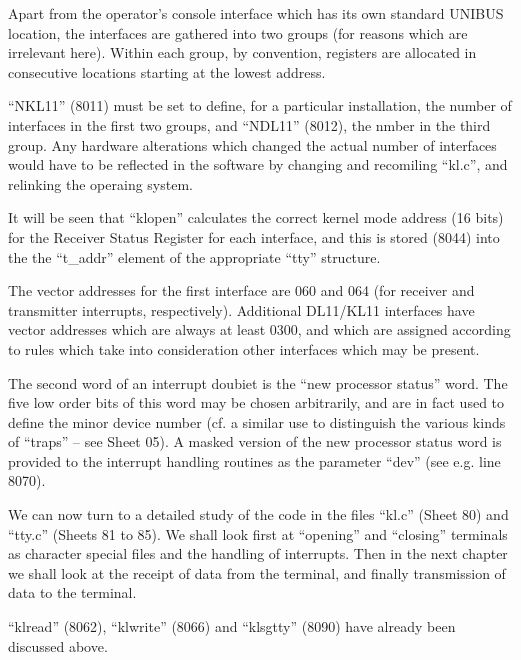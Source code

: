 Apart from the operator's console
interface which has its own standard
UNIBUS location, the interfaces are
gathered into two groups (for reasons
which are irrelevant here). Within
each group, by convention, registers
are allocated in consecutive locations
starting at the lowest address.


``NKL11'' (8011) must be set to define,
for a particular installation, the
number of interfaces in the first two
groups, and ``NDL11'' (8012), the nmber
in the third group. Any hardware
alterations which changed the actual
number of interfaces would have to be
reflected in the software by changing
and recomiling ``kl.c'', and relinking
the operaing system.

It will be seen that ``klopen'' calculates the correct kernel mode address
(16 bits) for the Receiver Status
Register for each interface, and this
is stored (8044) into the the ``t\_addr''
element of the appropriate ``tty'' structure.


The vector addresses for the first
interface are 060 and 064 (for receiver
and transmitter interrupts, respectively).
Additional DL11/KL11 interfaces have vector addresses which are
always at least 0300, and which are
assigned according to rules which take
into consideration other interfaces
which may be present.

The second word of an interrupt doubiet
is the ``new processor status'' word. The
five low order bits of this word may be
chosen arbitrarily, and are in fact
used to define the minor device number
(cf. a similar use to distinguish the
various kinds of ``traps'' -- see Sheet
05). A masked version of the new processor status word is provided to the
interrupt handling routines as the
parameter ``dev'' (see e.g. line 8070).


We can now turn to a detailed study of
the code in the files ``kl.c'' (Sheet 80)
and ``tty.c'' (Sheets 81 to 85). We
shall look first at ``opening'' and
``closing'' terminals as character
special files and the handling of interrupts. Then in the next chapter we
shall look at the receipt of data from
the terminal, and finally transmission
of data to the terminal.

``klread'' (8062), ``klwrite'' (8066) and
``klsgtty'' (8090) have already been discussed above.



